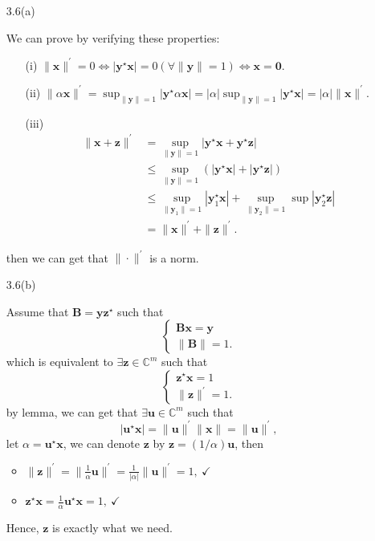 \begin{enumerate}
    \item[3.6(a)] {
    We can prove by verifying these properties:
        \begin{enumerate}
            \item[(i)] $ \|\bm{x}\|^{\prime} = 0 \Leftrightarrow | \bm{y}^{\star} \bm{x} | = 0 ( \forall \| \bm{y} \| = 1) \Leftrightarrow \bm{x} = \bm{0}$.
            \item[(ii)] $ \| \alpha \bm{x} \|^{\prime} = \sup_{\| \bm{y} \| = 1} | \bm{y}^{\star} \alpha \bm{x} | = |\alpha| \sup_{\| \bm{y} \|  = 1}  |\bm{y}^{\star}  \bm{x} |  = |\alpha| \| \bm{x}\|^{\prime}$.
            \item[(iii)] {
                $$
                \begin{aligned}
                    \| \bm{x + z}\|^{\prime} & = \sup_{\| \bm{y} \| = 1} | \bm{y}^{\star} \bm{x} + \bm{y}^{\star} \bm{z}| \\ 
                                            & \leq \sup_{\| \bm{y} \| = 1} ( |\bm{y}^{\star} \bm{x} | + | \bm{y}^{\star} \bm{z} |) \\
                                            & \leq \sup_{\| \bm{y}_1 \| = 1} | \bm{y}_1^\star \bm{x} | + \sup_{\| \bm{y}_2\| = 1} \sup | \bm{y}_2^{\star} \bm{z} | \\
                                            & = \| \bm{x}\|^{\prime} + \| \bm{z}\|^\prime.
                \end{aligned}
                $$
            }
        \end{enumerate}
        then we can get that $\| \cdot \|^\prime$ is a norm.
    }

    \item[3.6(b)] {
        Assume that $\bm{B} = \bm{y} \bm{z}^{\star}$ such that
        $$
        \begin{cases}
            \bm{Bx} = \bm{y} \\
            \| \bm{B}\| = 1.
        \end{cases}
        $$
        which is equivalent to $\exists \bm{z} \in \mathbb{C}^m$ such that
        $$
        \begin{cases}
            \bm{z}^{\star} \bm{x} = 1 \\
            \| \bm{z}\|^{\prime} = 1.
        \end{cases}
        $$
        by lemma, we can get that $\exists \bm{u} \in \mathbb{C}^{m}$ such that
        $$
        | \bm{u}^\star \bm{x} | = \| \bm{u} \|^\prime \| \bm{x} \| = \| \bm{u} \|^{\prime},
        $$
        let $\alpha =  \bm{u}^\star \bm{x}$, we can denote $\bm{z}$ by $\bm{z} = (1/\alpha) \bm{u}$, then
        \begin{itemize}
            \item $ \| \bm{z} \|^{\prime} = \| \frac{1}{\alpha} \bm{u}\|^{\prime} = \frac{1}{|\alpha|} \| \bm{u} \|^{\prime} = 1, ~ \checkmark$
            \item $ \bm{z}^{\star} \bm{x} = \frac{1}{\alpha} \bm{u}^\star \bm{x} = 1, ~\checkmark$
        \end{itemize}
        Hence, $\bm{z}$ is exactly what we need.
    }
\end{enumerate}
